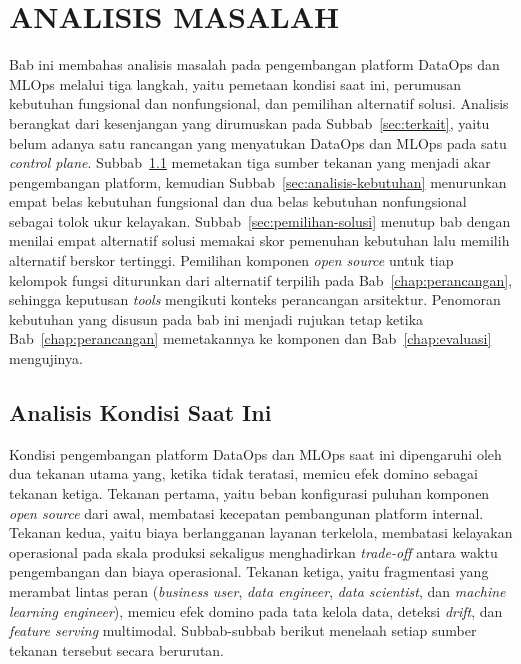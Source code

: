 \cleardoublepage
\chapter{ANALISIS MASALAH}
\label{chap:analisis-masalah}

Bab ini membahas analisis masalah pada pengembangan platform DataOps dan MLOps melalui tiga langkah, yaitu pemetaan kondisi saat ini, perumusan kebutuhan fungsional dan nonfungsional, dan pemilihan alternatif solusi. Analisis berangkat dari kesenjangan yang dirumuskan pada Subbab~\ref{sec:terkait}, yaitu belum adanya satu rancangan yang menyatukan DataOps dan MLOps pada satu \textit{control plane}. Subbab~\ref{sec:kondisi-saat-ini} memetakan tiga sumber tekanan yang menjadi akar pengembangan platform, kemudian Subbab~\ref{sec:analisis-kebutuhan} menurunkan empat belas kebutuhan fungsional dan dua belas kebutuhan nonfungsional sebagai tolok ukur kelayakan. Subbab~\ref{sec:pemilihan-solusi} menutup bab dengan menilai empat alternatif solusi memakai skor pemenuhan kebutuhan lalu memilih alternatif berskor tertinggi. Pemilihan komponen \textit{open source} untuk tiap kelompok fungsi diturunkan dari alternatif terpilih pada Bab~\ref{chap:perancangan}, sehingga keputusan \textit{tools} mengikuti konteks perancangan arsitektur. Penomoran kebutuhan yang disusun pada bab ini menjadi rujukan tetap ketika Bab~\ref{chap:perancangan} memetakannya ke komponen dan Bab~\ref{chap:evaluasi} mengujinya.

\section{Analisis Kondisi Saat Ini}
\label{sec:kondisi-saat-ini}

Kondisi pengembangan platform DataOps dan MLOps saat ini dipengaruhi oleh dua tekanan utama yang, ketika tidak teratasi, memicu efek domino sebagai tekanan ketiga. Tekanan pertama, yaitu beban konfigurasi puluhan komponen \textit{open source} dari awal, membatasi kecepatan pembangunan platform internal. Tekanan kedua, yaitu biaya berlangganan layanan terkelola, membatasi kelayakan operasional pada skala produksi sekaligus menghadirkan \textit{trade-off} antara waktu pengembangan dan biaya operasional. Tekanan ketiga, yaitu fragmentasi yang merambat lintas peran (\textit{business user}, \textit{data engineer}, \textit{data scientist}, dan \textit{machine learning engineer}), memicu efek domino pada tata kelola data, deteksi \textit{drift}, dan \textit{feature serving} multimodal. Subbab-subbab berikut menelaah setiap sumber tekanan tersebut secara berurutan.

